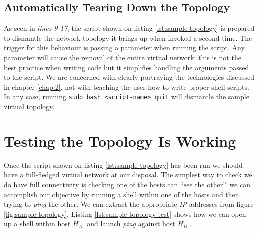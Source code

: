         \subsection{Automatically Tearing Down the Topology}
            As seen in \textit{lines 9-17}, the script shown on listing \ref{lst:sample-topology} is prepared to dismantle the network topology it brings up when invoked a second time. The trigger for this behaviour is passing a parameter when running the script. Any parameter will cause the removal of the entire virtual network: this is not the best practice when writing code but it simplifies handling the arguments passed to the script. We are concerned with clearly portraying the technologies discussed in chapter \ref{chap:2}, not with teaching the user how to write proper shell scripts. In any case, running \texttt{sudo bash <script-name> quit} will dismantle the sample virtual topology.\\

        

    \section{Testing the Topology Is Working}
        Once the script shown on listing \ref{lst:sample-topology} has been run we should have a full-fledged virtual network at our disposal. The simplest way to check we do have full connectivity is checking one of the hosts can ``see the other''. we can accomplish our objective by running a shell within one of the hosts and then trying to \textit{ping} the other. We can extract the appropriate \textit{IP} addresses from figure \ref{fig:sample-topology}. Listing \ref{lst:sample-topology-test} shows how we can open up a shell within host $H_{A_1}$ and launch \textit{ping} against host $H_{B_1}$.\\

